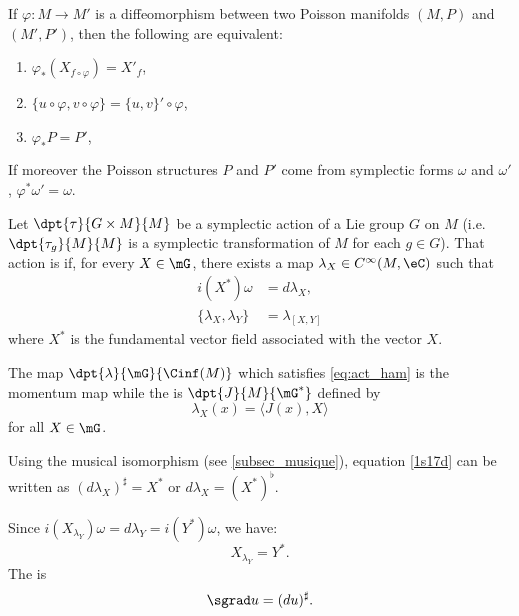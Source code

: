 \begin{theorem}\label{tho:equiv_Poisson}
If $\varphi\colon M\to M'$ is a diffeomorphism between two Poisson manifolds $(M,P)$ and $(M',P')$, then the following are equivalent:
\begin{enumerate}
\item $\varphi_*(X_{f\circ\varphi})=X'_f$,
\item\label{ite_equivii} $\{u\circ\varphi,v\circ\varphi\}=\{u,v\}'\circ\varphi$,
\item $\varphi_*P=P'$,
\end{enumerate}
If moreover the Poisson structures $P$ and $P'$ come from symplectic forms $\omega$ and $\omega'$, $\varphi^*\omega'=\omega$.
\end{theorem}

\begin{definition}
Let $\dpt{\tau}{G\times M}{M}$ be a symplectic action of a Lie group $G$ on $M$ (i.e. $\dpt{\tau_g}{M}{M}$ is a symplectic transformation of $M$ for each $g\in G$). That action is  if, for every $X\in\mG$, there exists a map $\lambda_X\in C^{\infty}(M,\eC)$ such that
\begin{subequations}\label{eq:act_ham}
\begin{align} 
  i(X^*)\omega&=d\lambda_X,\label{1s17d}\\
  \{\lambda_X,\lambda_Y\}&=\lambda_{[X,Y]}\label{eq:hamil}
 \end{align}
\end{subequations}
where $X^*$ is the fundamental vector field associated with the vector $X$.
\end{definition}

\begin{definition}
The map $\dpt{\lambda}{\mG}{\Cinf(M)}$ which satisfies \eqref{eq:act_ham} is the  momentum map while the  is $\dpt{J}{M}{\mG^*}$ defined by
   \begin{equation} \label{eq:defmomm ap}
     \lambda_X(x)=\langle J(x),X\rangle
   \end{equation}
for all $X\in\mG$.
\label{def:app_mom_mom_duale}
\end{definition}
Using the musical isomorphism (see \ref{subsec_musique}), equation \eqref{1s17d} can be written as $(d\lambda_X)^{\sharp}=X^*$ or $d\lambda_X=(X^*)^{\flat}$.

Since $i(X_{\lambda_Y})\omega=d\lambda_Y=i(Y^*)\omega$, we have:
\begin{equation} \label{eq_XlambdaYs}
   X_{\lambda_Y}=Y^*.
\end{equation} 
The  is
\[
  \sgrad u=(du)^{\sharp}.
\]

